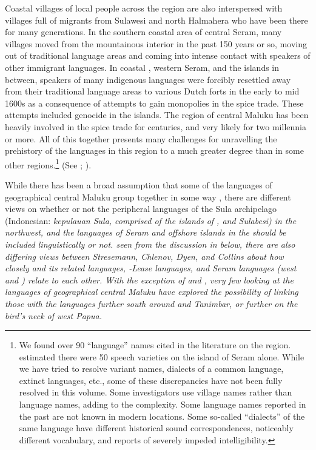 Coastal villages of local people across the region are also interspersed
with villages full of migrants from Sulawesi
and north Halmahera who have been there for many generations.
In the southern coastal area of central Seram,
many villages moved from the mountainous interior in the past
150 years or so,
moving out of traditional language areas
and coming into intense contact with speakers of other immigrant languages.
In coastal , western Seram,
and the islands in between,
speakers of many indigenous languages were forcibly resettled
away from their traditional language areas to various Dutch forts
in the early to mid 1600s as a consequence of attempts to gain
monopolies in the spice trade.
These attempts included genocide in the  islands.
The region of central Maluku has been heavily involved in the
spice trade for centuries,
and very likely for two millennia or more.
All of this together presents many challenges for unravelling
the prehistory of the languages in this region to a much greater
degree than in some other regions.\footnote{
		We found over 90
		“language” names cited in the literature on the region.
		\citet[1]{Stresemann1927} estimated there were 50 speech varieties
		on the island of Seram alone.
		While we have tried to resolve variant names,
		dialects of a common language,
		extinct languages, etc., some of these discrepancies have not
		been fully resolved in this volume.
		Some investigators use village names rather than language names,
		adding to the complexity.
		Some language names reported in the past are not known in modern locations.
		Some so-called “dialects” of the same language have different
		historical sound correspondences, noticeably different vocabulary, and reports of severely impeded
		intelligibility.}
(See ; 
\citealp{Collins1982c,Collins2003b,
Florey1991,Grimes1994,Grimes2010b,
MusgraveEwing2006}).

While there has been a broad assumption that some of the languages
of geographical central Maluku group together in some way \citep{Stresemann1927,
Dyen1965,Dyen1978a,Chlenov1976,Collins1981,
Collins1982c,Collins1983,Collins1986}, there are different views on whether or
not the peripheral languages of the Sula archipelago (Indonesian:
\it{kepulauan Sula}, comprised of the islands of ,
 and Sulabesi) in the northwest,
and the languages of  Seram
and offshore islands  in the  should be included linguistically or not.
 seen from the discussion in  below,
there are also differing views between Stresemann,
Chlenov, Dyen, and Collins about how closely 
and its related languages,
-Lease languages, and Seram languages (west
and ) relate to each other.
With the exception of \citet{Chlenov1976}
and \citet{LoskiLoski1989}, very few looking at the languages
of geographical central Maluku have explored the possibility
of linking those with the languages further south around 
and Tanimbar, or further  on the bird’s neck of west Papua.

